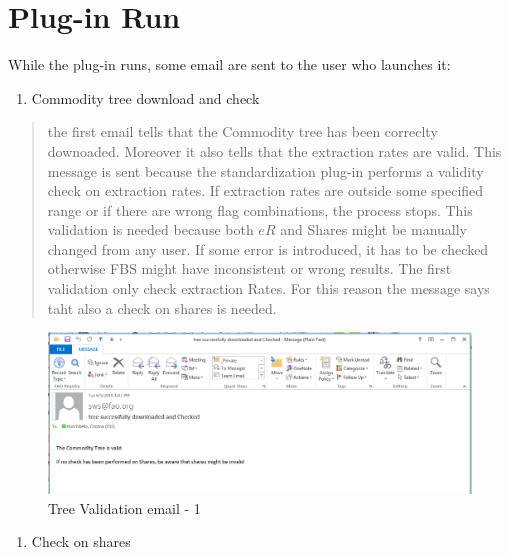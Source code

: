 \documentclass[]{article}
\providecommand{\tightlist}{%
  \setlength{\itemsep}{0pt}\setlength{\parskip}{0pt}}
\begin{document}
\section{Plug-in Run}\label{plug-in-run}

While the plug-in runs, some email are sent to the user who launches it:

\begin{enumerate}
\def\labelenumi{\arabic{enumi}.}
\tightlist
\item
  Commodity tree download and check
\end{enumerate}

\begin{quote}
the first email tells that the Commodity tree has been correclty
downoaded. Moreover it also tells that the extraction rates are valid.
This message is sent because the standardization plug-in performs a
validity check on extraction rates. If extraction rates are outside some
specified range or if there are wrong flag combinations, the process
stops. This validation is needed because both \(eR\) and Shares might be
manually changed from any user. If some error is introduced, it has to
be checked otherwise FBS might have inconsistent or wrong results. The
first validation only check extraction Rates. For this reason the
message says taht also a check on shares is needed.
\end{quote}

\begin{figure}[H]

{\centering \includegraphics[width=1\linewidth]{images/standPlugin/31_email1} 

}

\caption{\label{fig:f31}Tree Validation email - 1}\label{fig:f31}
\end{figure}

\begin{enumerate}
\def\labelenumi{\arabic{enumi}.}
\setcounter{enumi}{1}
\tightlist
\item
  Check on shares
\end{enumerate}
\end{document}
